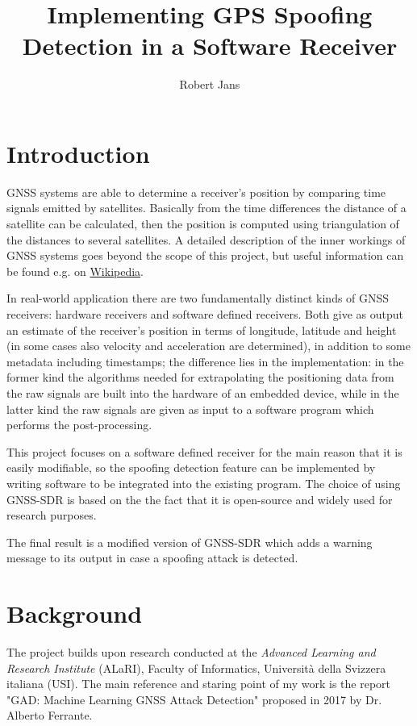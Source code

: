 \documentclass[a4paper]{usiinfbachelorproject}
\author{Robert Jans}
\title{\textbf{Implementing GPS Spoofing Detection in a Software Receiver}}
\begin{document}
\maketitle
\tableofcontents\newpage

\section{\textbf{Introduction}}

GNSS systems are able to determine a receiver's position by comparing time signals emitted by satellites. Basically
from the time differences the distance of a satellite can be calculated, then the position is computed using triangulation of the distances to several satellites. A detailed description of the inner workings of GNSS systems goes beyond the scope of this project, but useful information can be found e.g. on 
\href{https://en.wikipedia.org/wiki/Satellite\_navigation}{Wikipedia}.

In real-world application there are two fundamentally distinct kinds of GNSS receivers: hardware receivers and software defined receivers. Both give as output an estimate of the receiver's position in terms of longitude, latitude and height
(in some cases also velocity and acceleration are determined), in addition to some metadata including timestamps; the difference lies in the implementation: in the former kind the algorithms needed for extrapolating the positioning data
from the raw signals are built into the hardware of an embedded device, while in the latter kind the raw signals are given as input to a software program which performs the post-processing.

This project focuses on a software defined receiver for the main reason that it is easily modifiable, so the
spoofing detection feature can be implemented by writing software to be integrated into the existing program.
The choice of using GNSS-SDR is based on the the fact that it is open-source and widely used for research purposes. 

The final result is a modified version of GNSS-SDR which adds a warning message to its output in case a spoofing attack is detected.


\section{\textbf{Background}}

The project builds upon research conducted at the \emph{Advanced Learning and Research Institute} (ALaRI), Faculty of Informatics, Università della Svizzera italiana (USI).
The main reference and staring point of my work is the report 
"GAD: Machine Learning GNSS Attack Detection" proposed in 2017 by Dr. Alberto Ferrante.
\end{document}
